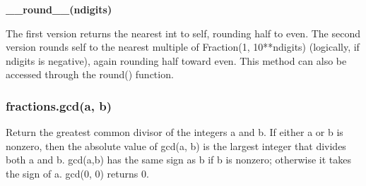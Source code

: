 \textbf{\_\_round\_\_(ndigits)}

The first version returns the nearest int to self, rounding half to even. The second version rounds self to the nearest multiple of Fraction(1, 10**ndigits) (logically, if ndigits is negative), again rounding half toward even. This method can also be accessed through the round() function.

\subsubsection{fractions.gcd(a, b)}

Return the greatest common divisor of the integers a and b. If either a or b is nonzero, then the absolute value of gcd(a, b) is the largest integer that divides both a and b. gcd(a,b) has the same sign as b if b is nonzero; otherwise it takes the sign of a. gcd(0, 0) returns 0.










